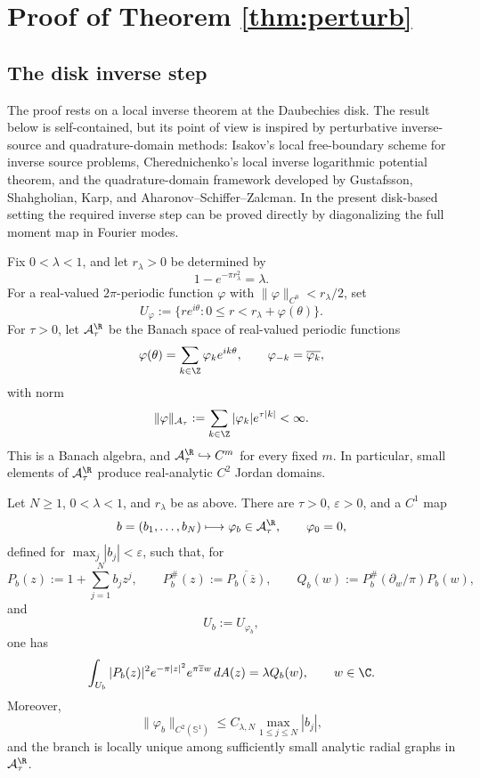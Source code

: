 \section{Proof of Theorem \ref{thm:perturb}}

\subsection{The disk inverse step}\label{subsec:disk-inverse-step}

The proof rests on a local inverse theorem at the Daubechies disk. The result
below is self-contained, but its point of view is inspired by perturbative
inverse-source and quadrature-domain methods: Isakov's local free-boundary
scheme for inverse source problems, Cherednichenko's local inverse logarithmic
potential theorem, and the quadrature-domain framework developed by
Gustafsson, Shahgholian, Karp, and Aharonov--Schiffer--Zalcman. In the present
disk-based setting the required inverse step can be proved directly by
diagonalizing the full moment map in Fourier modes.

Fix \(0<\lambda<1\), and let \(r_\lambda>0\) be determined by
\[
1-e^{-\pi r_\lambda^2}=\lambda .
\]
For a real-valued \(2\pi\)-periodic function \(\varphi\) with
\(\|\varphi\|_{C^0}<r_\lambda/2\), set
\[
U_\varphi
:=
\{re^{i\theta}:0\le r<r_\lambda+\varphi(\theta)\}.
\]
For \(\tau>0\), let \(\mathcal A_\tau^\R\) be the Banach space of real-valued
periodic functions
\[
\varphi(\theta)=\sum_{k\in\Z}\varphi_k e^{ik\theta},
\qquad
\varphi_{-k}=\overline{\varphi_k},
\]
with norm
\[
\|\varphi\|_{\mathcal A_\tau}
:=
\sum_{k\in\Z}|\varphi_k|e^{\tau |k|}<\infty .
\]
This is a Banach algebra, and \(\mathcal A_\tau^\R\hookrightarrow C^m\) for
every fixed \(m\). In particular, small elements of \(\mathcal A_\tau^\R\)
produce real-analytic \(C^2\) Jordan domains.

\begin{proposition}\label{prop:disk-inverse-tailored}
Let \(N\ge1\), \(0<\lambda<1\), and \(r_\lambda\) be as above. There are
\(\tau>0\), \(\varepsilon>0\), and a \(C^1\) map
\[
b=(b_1,\ldots,b_N)\longmapsto \varphi_b\in\mathcal A_\tau^\R,
\qquad
\varphi_0=0,
\]
defined for \(\max_j|b_j|<\varepsilon\), such that, for
\[
P_b(z):=1+\sum_{j=1}^N b_jz^j,
\qquad
P_b^\#(z):=\overline{P_b(\overline z)},
\qquad
Q_b(w):=P_b^\#(\partial_w/\pi)P_b(w),
\]
and
\[
U_b:=U_{\varphi_b},
\]
one has
\begin{equation}\label{eq:disk-inverse-identity}
\int_{U_b}|P_b(z)|^2e^{-\pi |z|^2}e^{\pi\overline z w}\,dA(z)
=
\lambda Q_b(w),
\qquad w\in\C .
\end{equation}
Moreover,
\[
\|\varphi_b\|_{C^2(\mathbb S^1)}
\le C_{\lambda,N}\max_{1\le j\le N}|b_j|,
\]
and the branch is locally unique among sufficiently small analytic radial
graphs in \(\mathcal A_\tau^\R\).
\end{proposition}

